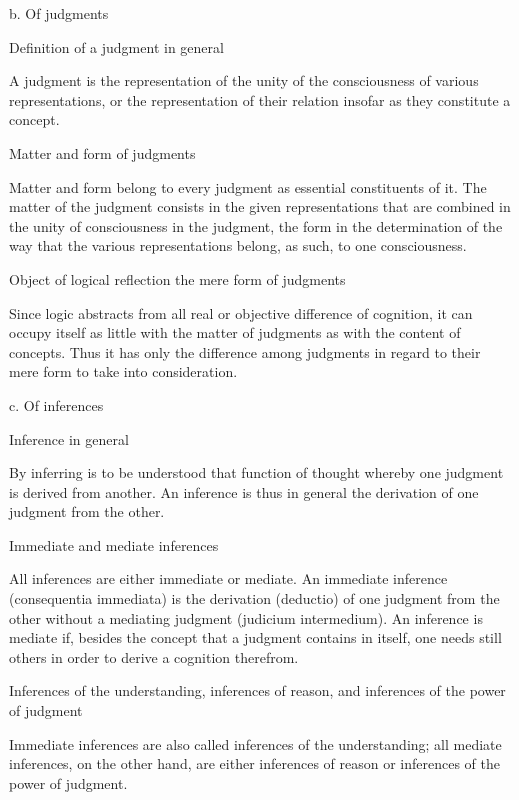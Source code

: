 b. Of judgments

Definition of a judgment in general

    A judgment is the representation of the unity of
    the consciousness of various representations,
    or the representation of their relation
    insofar as they constitute a concept.

Matter and form of judgments

    Matter and form belong to every judgment
    as essential constituents of it.
    The matter of the judgment consists in
    the given representations that are combined
    in the unity of consciousness in the judgment,
    the form in the determination of the way that
    the various representations belong, as such,
    to one consciousness.

Object of logical reflection the mere form of judgments

    Since logic abstracts from all real or objective
    difference of cognition,
    it can occupy itself as little with the matter of judgments
    as with the content of concepts.
    Thus it has only the difference among judgments
    in regard to their mere form to take into consideration.

c. Of inferences

Inference in general

    By inferring is to be understood that function of thought
    whereby one judgment is derived from another.
    An inference is thus in general
    the derivation of one judgment from the other.

Immediate and mediate inferences

    All inferences are either immediate or mediate.
    An immediate inference (consequentia immediata) is
    the derivation (deductio) of one judgment from the other
    without a mediating judgment (judicium intermedium).
    An inference is mediate if, besides the concept
    that a judgment contains in itself,
    one needs still others in order to
    derive a cognition therefrom.

Inferences of the understanding, inferences of reason,
and inferences of the power of judgment

    Immediate inferences are also called
    inferences of the understanding;
    all mediate inferences, on the other hand,
    are either inferences of reason
    or inferences of the power of judgment.

